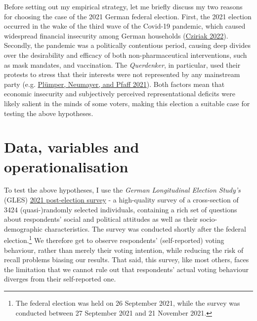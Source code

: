 \documentclass[
]{article}
\begin{document}
Before setting out my empirical strategy, let me briefly discuss my two
reasons for choosing the case of the 2021 German federal election.
First, the 2021 election occurred in the wake of the third wave of the
Covid-19 pandemic, which caused widespread financial insecurity among
German households
(\protect\hyperlink{ref-cziriak_publication_nodate}{Cziriak 2022}).
Secondly, the pandemic was a politically contentious period, causing
deep divides over the desirability and efficacy of both
non-pharmaceutical interventions, such as mask mandates, and
vaccination. The \emph{Querdenker}, in particular, used their protests
to stress that their interests were not represented by any mainstream
party (e.g. \protect\hyperlink{ref-plumper_strategy_2021}{Plümper,
Neumayer, and Pfaff 2021}). Both factors mean that economic insecurity
and subjectively perceived representational deficits were likely salient
in the minds of some voters, making this election a suitable case for
testing the above hypotheses.

\hypertarget{data-variables-and-operationalisation}{%
\section{Data, variables and
operationalisation}\label{data-variables-and-operationalisation}}

To test the above hypotheses, I use the \emph{German Longitudinal
Election Study's} (GLES)
\href{https://search.gesis.org/research_data/ZA7701}{2021 post-election
survey} - a high-quality survey of a cross-section of 3424
(quasi-)randomly selected individuals, containing a rich set of
questions about respondents' social and political attitudes as well as
their socio-demographic characteristics. The survey was conducted
shortly after the federal election.\footnote{The federal election was
  held on 26 September 2021, while the survey was conducted between 27
  September 2021 and 21 November 2021.} We therefore get to observe
respondents' (self-reported) voting behaviour, rather than merely their
voting intention, while reducing the risk of recall problems biasing our
results. That said, this survey, like most others, faces the limitation
that we cannot rule out that respondents' actual voting behaviour
diverges from their self-reported one.
\end{document}
